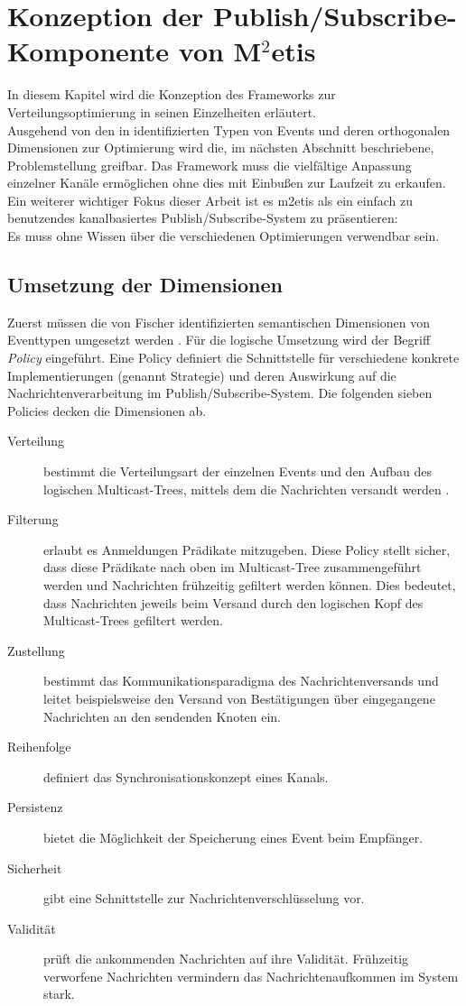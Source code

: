 \chapter[Konzeption der Publish/Subscribe-Komponente]{Konzeption der Publish/Subscribe-Komponente von M$^2$etis}
\label{chap:konzeption_pubsub}
In diesem Kapitel wird die Konzeption des Frameworks zur Verteilungsoptimierung in seinen Einzelheiten erläutert.\\
Ausgehend von den in \cite{Fischer2010a} identifizierten Typen von Events und deren orthogonalen Dimensionen zur Optimierung wird die, im nächsten Abschnitt beschriebene, Problemstellung greifbar. Das Framework muss die vielfältige Anpassung einzelner Kanäle ermöglichen ohne dies mit Einbußen zur Laufzeit zu erkaufen. Ein weiterer wichtiger Fokus dieser Arbeit ist es \ac{m2etis} als ein einfach zu benutzendes kanalbasiertes Publish/Subscribe-System zu präsentieren:\\
Es muss ohne Wissen über die verschiedenen Optimierungen verwendbar sein.



\section{Umsetzung der Dimensionen}
Zuerst müssen die von Fischer identifizierten semantischen Dimensionen von Eventtypen umgesetzt werden \cite{Fischer2010Event}. Für die logische Umsetzung wird der Begriff \emph{Policy} eingeführt. Eine Policy definiert die Schnittstelle für verschiedene konkrete Implementierungen (genannt Strategie) und deren Auswirkung auf die Nachrichtenverarbeitung im Publish/Subscribe-System. Die folgenden sieben Policies decken die Dimensionen ab.

\begin{description}
\item[Verteilung] bestimmt die Verteilungsart der einzelnen Events und den Aufbau des logischen Multicast-Trees, mittels dem die Nachrichten versandt werden \cite{KostasKatrinis2005}.
\item[Filterung] erlaubt es Anmeldungen Prädikate mitzugeben. Diese Policy stellt sicher, dass diese Prädikate nach oben im Multicast-Tree zusammengeführt werden und Nachrichten frühzeitig gefiltert werden können. Dies bedeutet, dass Nachrichten jeweils beim Versand durch den logischen Kopf des Multicast-Trees gefiltert werden.
\item[Zustellung] bestimmt das Kommunikationsparadigma des Nachrichtenversands und leitet beispielsweise den Versand von Bestätigungen über eingegangene Nachrichten an den sendenden Knoten ein.
\item[Reihenfolge] definiert das Synchronisationskonzept eines Kanals.
\item[Persistenz] bietet die Möglichkeit der Speicherung eines Event beim Empfänger.
\item[Sicherheit] gibt eine Schnittstelle zur Nachrichtenverschlüsselung vor.
\item[Validität] prüft die ankommenden Nachrichten auf ihre Validität. Frühzeitig verworfene Nachrichten vermindern das Nachrichtenaufkommen im System stark.
\end{description}

